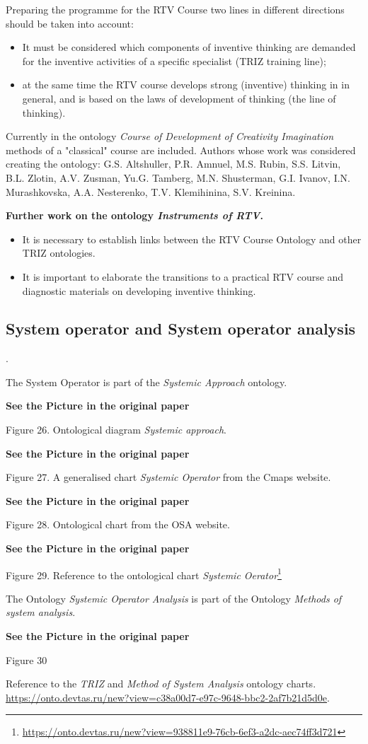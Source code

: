\documentclass[11pt,a4paper]{article}
\newcommand{\addpicture}{\textbf{See the Picture in the original paper}\par}
\begin{document}
Preparing the programme for the RTV Course two lines in different directions
should be taken into account:
\begin{itemize}
\item It must be considered which components of inventive thinking are
  demanded for the inventive activities of a specific specialist (TRIZ
  training line);
\item at the same time the RTV course develops strong (inventive) thinking in
  in general, and is based on the laws of development of thinking (the line of
  thinking).
\end{itemize}
Currently in the ontology \emph{Course of Development of Creativity
  Imagination} methods of a "classical" course are included. Authors whose
work was considered creating the ontology: G.S. Altshuller, P.R. Amnuel,
M.S. Rubin, S.S. Litvin, B.L. Zlotin, A.V. Zusman, Yu.G. Tamberg,
M.N. Shusterman, G.I. Ivanov, I.N. Murashkovska, A.A. Nesterenko,
T.V. Klemihinina, S.V. Kreinina.

\textbf{Further work on the ontology \emph{Instruments of RTV}.}
\begin{itemize}
\item It is necessary to establish links between the RTV Course Ontology
  and other TRIZ ontologies.  
\item It is important to elaborate the transitions to a practical RTV course
  and diagnostic materials on developing inventive thinking.
\end{itemize}

\subsection{System operator and System operator analysis}.

The System Operator is part of the \emph{Systemic Approach} ontology.
\begin{center}
  \addpicture
  Figure 26. Ontological diagram \emph{Systemic approach}.
\end{center}
\begin{center}
  \addpicture
  Figure 27. A generalised chart \emph{Systemic Operator} from the Cmaps
  website. 
\end{center}
\begin{center}
  \addpicture
  Figure 28. Ontological chart from the OSA website.
\end{center}
\begin{center}
  \addpicture
  Figure 29.  Reference to the ontological chart \emph{Systemic
    Oerator}\footnote{\url{https://onto.devtas.ru/new?view=938811e9-76cb-6ef3-a2dc-aec74ff3d721}} 
\end{center}
The Ontology \emph{Systemic Operator Analysis} is part of the Ontology
\emph{Methods of system analysis}.
\begin{center}
  \addpicture
  Figure 30
\end{center}
Reference to the \emph{TRIZ} and \emph{Method of System Analysis} ontology
charts. 
\url{https://onto.devtas.ru/new?view=c38a00d7-e97c-9648-bbc2-2af7b21d5d0e}.
\end{document}
